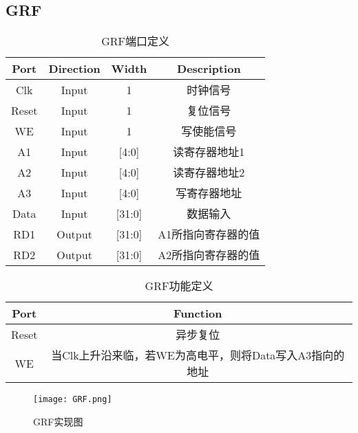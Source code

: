 \documentclass[UTF8]{ctexart}
\begin{document}
\subsection{GRF}
\begin{table}[H]
	\centering
	\begin{threeparttable}
		\caption{GRF端口定义}
		\begin{tabular}{cccc}
			\toprule
			\rowcolor{mypink}
			\textbf{Port} & \textbf{Direction} & \textbf{Width} & \textbf{Description} \\
			\midrule
			Clk           & Input              & 1              & 时钟信号             \\
			\midrule
			Reset         & Input              & 1              & 复位信号             \\
			\midrule
			WE            & Input              & 1              & 写使能信号           \\
			\midrule
			A1            & Input              & [4:0]          & 读寄存器地址1        \\
			\midrule
			A2            & Input              & [4:0]          & 读寄存器地址2        \\
			\midrule
			A3            & Input              & [4:0]          & 写寄存器地址         \\
			\midrule
			Data          & Input              & [31:0]         & 数据输入             \\
			\midrule
			RD1           & Output             & [31:0]         & A1所指向寄存器的值   \\
			\midrule
			RD2           & Output             & [31:0]         & A2所指向寄存器的值   \\
			\midrule
		\end{tabular}
	\end{threeparttable}
\end{table}
\begin{table}[H]
	\centering
	\begin{threeparttable}
		\caption{GRF功能定义}
		\begin{tabular}{cc}
			\toprule
			\rowcolor{mypink}
			\textbf{Port} & \textbf{Function}                                       \\
			\midrule
			Reset         & 异步复位                                                \\
			\midrule
			WE            & 当Clk上升沿来临，若WE为高电平，则将Data写入A3指向的地址 \\
			\midrule
		\end{tabular}
	\end{threeparttable}
\end{table}
\begin{figure}[H]
	\centering
	\texttt{[image: GRF.png]}
	\caption{GRF实现图}
\end{figure}
\newpage
\end{document}

